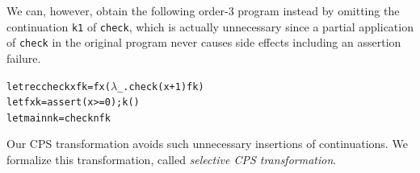 \begin{enumerate}
      We can, however, obtain the following order-3 program instead by
      omitting the continuation \texttt{k1} of \texttt{check}, which is
      actually unnecessary since a partial application of \texttt{check}
      in the original program never causes side effects including an
      assertion failure.
\vspace{-5pt}
\begin{alltt}
 letrec check x f k = f x (\(\lambda\)_.check (x+1) f k)
 let f x k = assert (x >= 0); k ()
 let main n k = check n f k
\end{alltt}
\vspace{-5pt}
      Our CPS transformation avoids such unnecessary insertions of
      continuations.  We formalize this transformation, called
      \emph{selective CPS transformation}.


\end{enumerate}
